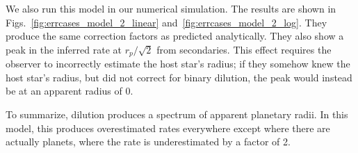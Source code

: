 We also run this model in our numerical simulation.
The results are shown in Figs.~\ref{fig:errcases_model_2_linear} 
and~\ref{fig:errcases_model_2_log}.
They produce the same correction factors as predicted analytically.
They also show a peak in the inferred rate at $r_p/\sqrt{2}$ from 
secondaries.
This effect requires the observer to incorrectly estimate the host star's 
radius; if they somehow knew the host star's radius, but did not correct for 
binary dilution, the peak would instead be at an apparent radius of 0.

To summarize, dilution produces a spectrum of apparent planetary radii. In 
this model, this produces overestimated rates everywhere except where there 
are actually planets, where the rate is underestimated by a factor of 2.
